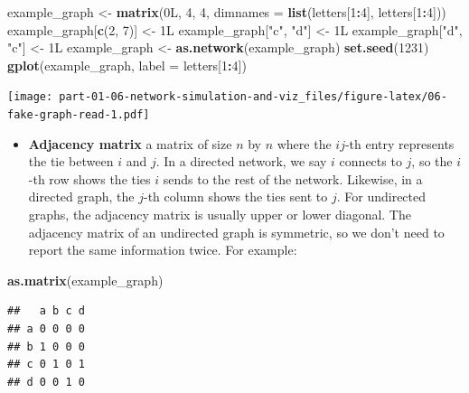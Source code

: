 \documentclass[
]{book}
\newenvironment{Shaded}{\begin{snugshade}}{\end{snugshade}}
\newcommand{\AttributeTok}[1]{\textcolor[rgb]{0.13,0.29,0.53}{#1}}
\newcommand{\DecValTok}[1]{\textcolor[rgb]{0.00,0.00,0.81}{#1}}
\newcommand{\FunctionTok}[1]{\textcolor[rgb]{0.13,0.29,0.53}{\textbf{#1}}}
\newcommand{\NormalTok}[1]{#1}
\newcommand{\OtherTok}[1]{\textcolor[rgb]{0.56,0.35,0.01}{#1}}
\newcommand{\SpecialCharTok}[1]{\textcolor[rgb]{0.81,0.36,0.00}{\textbf{#1}}}
\newcommand{\StringTok}[1]{\textcolor[rgb]{0.31,0.60,0.02}{#1}}
\providecommand{\tightlist}{%
  \setlength{\itemsep}{0pt}\setlength{\parskip}{0pt}}
\begin{document}
\begin{Shaded}
\begin{Highlighting}[]
\NormalTok{example\_graph }\OtherTok{\textless{}{-}} \FunctionTok{matrix}\NormalTok{(0L, }\DecValTok{4}\NormalTok{, }\DecValTok{4}\NormalTok{, }\AttributeTok{dimnames =} \FunctionTok{list}\NormalTok{(letters[}\DecValTok{1}\SpecialCharTok{:}\DecValTok{4}\NormalTok{], letters[}\DecValTok{1}\SpecialCharTok{:}\DecValTok{4}\NormalTok{]))}
\NormalTok{example\_graph[}\FunctionTok{c}\NormalTok{(}\DecValTok{2}\NormalTok{, }\DecValTok{7}\NormalTok{)] }\OtherTok{\textless{}{-}}\NormalTok{ 1L}
\NormalTok{example\_graph[}\StringTok{"c"}\NormalTok{, }\StringTok{"d"}\NormalTok{] }\OtherTok{\textless{}{-}}\NormalTok{ 1L}
\NormalTok{example\_graph[}\StringTok{"d"}\NormalTok{, }\StringTok{"c"}\NormalTok{] }\OtherTok{\textless{}{-}}\NormalTok{ 1L}
\NormalTok{example\_graph }\OtherTok{\textless{}{-}} \FunctionTok{as.network}\NormalTok{(example\_graph)}
\FunctionTok{set.seed}\NormalTok{(}\DecValTok{1231}\NormalTok{)}
\FunctionTok{gplot}\NormalTok{(example\_graph, }\AttributeTok{label =}\NormalTok{ letters[}\DecValTok{1}\SpecialCharTok{:}\DecValTok{4}\NormalTok{])}
\end{Highlighting}
\end{Shaded}

\texttt{[image: part-01-06-network-simulation-and-viz\_files/figure-latex/06-fake-graph-read-1.pdf]}

\begin{itemize}
\tightlist
\item
  \textbf{Adjacency matrix} a matrix of size \(n\) by \(n\) where the \(ij\)-th entry represents
  the tie between \(i\) and \(j\). In a directed network, we say \(i\) connects to \(j\),
  so the \(i\)-th row shows the ties \(i\) sends to the rest of the network. Likewise,
  in a directed graph, the \(j\)-th column shows the ties sent to \(j\). For undirected
  graphs, the adjacency matrix is usually upper or lower diagonal. The adjacency
  matrix of an undirected graph is symmetric, so we don't need to report the same
  information twice. For example:
\end{itemize}

\begin{Shaded}
\begin{Highlighting}[]
\FunctionTok{as.matrix}\NormalTok{(example\_graph)}
\end{Highlighting}
\end{Shaded}

\begin{verbatim}
##   a b c d
## a 0 0 0 0
## b 1 0 0 0
## c 0 1 0 1
## d 0 0 1 0
\end{verbatim}
\end{document}
